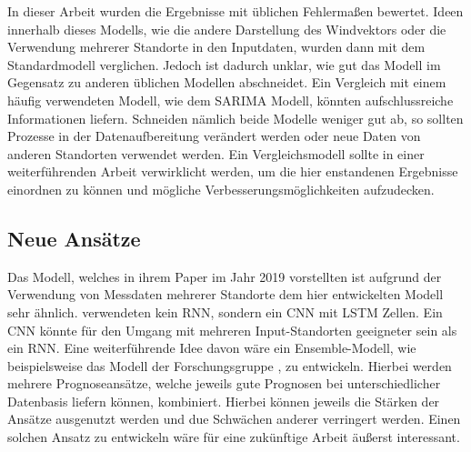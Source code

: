 \documentclass[
12pt, %
toc=listofnumbered, %
toc=chapterentrydotfill, %
numbers=noenddot, %
captions=tableheading, %
bibliography=numbered
]{scrreprt}
\let\Oldsubsection\subsection
\renewcommand{\subsection}{\FloatBarrier\Oldsubsection}
\begin{document}
\newline
In dieser Arbeit wurden die Ergebnisse mit üblichen Fehlermaßen bewertet. Ideen innerhalb dieses Modells, wie die andere Darstellung des Windvektors oder die Verwendung mehrerer Standorte in den Inputdaten, wurden dann mit dem Standardmodell verglichen. 
Jedoch ist dadurch unklar, wie gut das Modell im Gegensatz zu anderen üblichen Modellen abschneidet. Ein Vergleich mit einem häufig verwendeten Modell, wie dem SARIMA Modell, könnten aufschlussreiche Informationen liefern. 
Schneiden nämlich beide Modelle weniger gut ab, so sollten Prozesse in der Datenaufbereitung verändert werden oder neue Daten von anderen Standorten verwendet werden. Ein Vergleichsmodell sollte in einer weiterführenden Arbeit verwirklicht werden, um die hier enstandenen Ergebnisse einordnen zu können und mögliche Verbesserungsmöglichkeiten aufzudecken.

\subsection{Neue Ansätze}

Das Modell, welches \citeauthor{2019_Chen_MultifactorSpatiotemporalCorrelation} in ihrem Paper im Jahr 2019 vorstellten \cite{2019_Chen_MultifactorSpatiotemporalCorrelation} ist aufgrund der Verwendung von Messdaten mehrerer Standorte dem hier entwickelten Modell sehr ähnlich. 
\citeauthor{2019_Chen_MultifactorSpatiotemporalCorrelation} verwendeten kein RNN, sondern ein CNN mit LSTM Zellen. Ein CNN könnte für den Umgang mit mehreren Input-Standorten geeigneter sein als ein RNN.
\newline
Eine weiterführende Idee davon wäre ein Ensemble-Modell, wie beispielsweise das Modell der Forschungsgruppe \citeauthor{2017_Zhang_HybridMethodShortTerm} \cite{2017_Zhang_HybridMethodShortTerm}, zu entwickeln. Hierbei werden mehrere Prognoseansätze, welche jeweils gute Prognosen bei unterschiedlicher Datenbasis liefern können, kombiniert. 
Hierbei können jeweils die Stärken der Ansätze ausgenutzt werden und due Schwächen anderer verringert werden. Einen solchen Ansatz zu entwickeln wäre für eine zukünftige Arbeit äußerst interessant.
\end{document}
